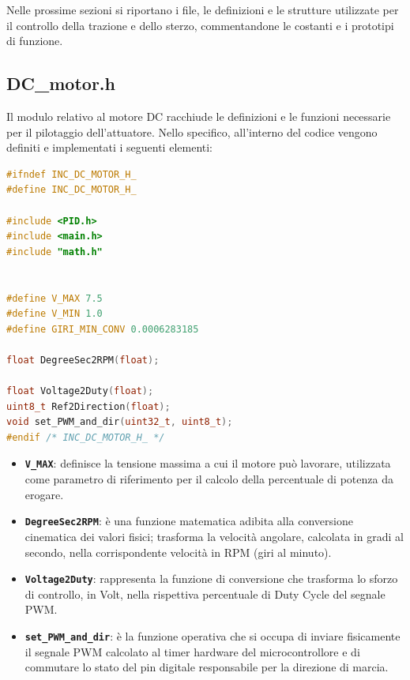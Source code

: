 \documentclass[11pt]{report}
\begin{document}
\noindent Nelle prossime sezioni si riportano i file, le definizioni e le strutture utilizzate per il controllo della trazione e dello sterzo, commentandone le costanti e i prototipi di funzione.

\vspace{0.4cm}
\subsection{DC\_motor.h} 
\noindent Il modulo relativo al motore DC racchiude le definizioni e le funzioni necessarie per il pilotaggio dell'attuatore. Nello specifico, all'interno del codice vengono definiti e implementati i seguenti elementi:

\begin{lstlisting}[language=Cpp, caption={DC\_motor.h}]
    #ifndef INC_DC_MOTOR_H_
#define INC_DC_MOTOR_H_

#include <PID.h>
#include <main.h>
#include "math.h"


#define V_MAX 7.5
#define V_MIN 1.0
#define GIRI_MIN_CONV 0.0006283185

float DegreeSec2RPM(float);

float Voltage2Duty(float);
uint8_t Ref2Direction(float);
void set_PWM_and_dir(uint32_t, uint8_t);
#endif /* INC_DC_MOTOR_H_ */
\end{lstlisting}

\begin{itemize}
    \item \textbf{\texttt{V\_MAX}}: definisce la tensione massima a cui il motore può lavorare, utilizzata come parametro di riferimento per il calcolo della percentuale di potenza da erogare.
    \item \textbf{\texttt{DegreeSec2RPM}}: è una funzione matematica adibita alla conversione cinematica dei valori fisici; trasforma la velocità angolare, calcolata in gradi al secondo, nella corrispondente velocità in RPM (giri al minuto).
    \item \textbf{\texttt{Voltage2Duty}}: rappresenta la funzione di conversione che trasforma lo sforzo di controllo, in Volt, nella rispettiva percentuale di Duty Cycle del segnale PWM.
    \item \textbf{\texttt{set\_PWM\_and\_dir}}: è la funzione operativa che si occupa di inviare fisicamente il segnale PWM calcolato al timer hardware del microcontrollore e di commutare lo stato del pin digitale responsabile per la direzione di marcia.
\end{itemize}
\end{document}
